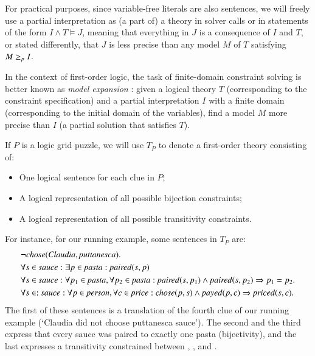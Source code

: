 For practical purposes, since variable-free literals are also sentences, we will freely use a partial interpretation as (a part of) a theory in solver calls or in statements of the form $I\land T \models J$, meaning that everything in $J$ is a consequence of $I$ and $T$, or stated differently, that $J$ is less precise than any model $M$ of $T$ satisfying $M\geq_p I$. 

In the context of first-order logic, the task of finite-domain constraint solving is better known as \emph{model expansion} \cite{MitchellTHM06}: given a logical theory $T$ (corresponding to the constraint specification) and a partial interpretation $I$ with a finite domain (corresponding to the initial domain of the variables), find a model $M$ more precise than $I$ (a partial solution that satisfies $T$).

If $P$ is a logic grid puzzle, we will use $T_P$ to denote a first-order theory consisting of:
\begin{itemize}
 \item One logical sentence for each clue in $P$;
 \item A logical representation of all possible bijection constraints;
 \item A logical representation of all possible transitivity constraints.
\end{itemize}
% 
For instance, for our running example, some sentences in $T_P$ are: 
\begin{align*}
 &\lnot \chose(\claudia, \puttanesca).\\
 & \forall s\in  \sauce : \exists p\in \pasta : \paired(s,p)\\
 & \forall s\in \sauce: \forall p_1\in  \pasta, \forall p_2\in  \pasta:  \paired(s,p_1)\land  \paired(s,p_2)\limplies p_1=p_2. \\
 & \forall s\in :\sauce: \forall p\in \person, \forall c\in \price: \chose(p,s)\land \payed(p,c)\limplies \priced(s,c).  %
\end{align*}
The first of these sentences is a translation of the fourth clue of our running example (`Claudia did not choose puttanesca sauce'). The second and the third express that every sauce was paired to exactly one pasta (bijectivity), and the last expresses a transitivity constrained between \chose, \payed, and  \priced. 


